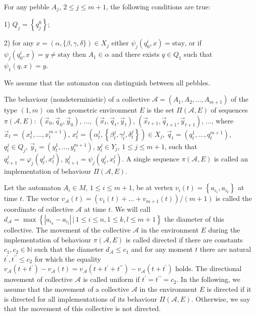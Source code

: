 \documentclass{article}
\begin{document}
For any pebble $A_{j}$, $2 \leq j \leq m+1$, the following conditions are true:

1) $Q_{j} = \left\{ q^{0}_{j} \right\}$;

2) for any $x = \left( \alpha, \{ \beta, \gamma, \delta \} \right) \in X_{j}$ either $\psi_{j} \left( q^{i}_{0}, x \right) = \mathrm{stay}$, or if $\psi_{j} \left( q^{i}_{0}, x \right) = y \neq \mathrm{stay}$ then $A_{1} \in \alpha$ and there exists $q \in Q_{1}$ such that $\psi_{1} \left( q, x \right) = y$.

We assume that the automaton can distinguish between all pebbles.

The behaviour (nondeterministic) of a collective $\mathcal{A} = \left( A_{1}, A_{2}, ..., A_{m+1} \right)$ of the type $(1, m)$ on the geometric environment $E$ is the set $\Pi (\mathcal{A}, E)$ of sequences $\pi (\mathcal{A}, E)$:
$\left( \vec x_{0}, \vec q_{0}, \vec y_{0} \right)$, ..., $\left( \vec x_{t}, \vec q_{t}, \vec y_{t} \right)$, 
$\left( \vec x_{t+1}, \vec q_{t+1}, \vec y_{t+1} \right)$, ...,
where 
$\vec x_{t} = \left( x_{t}^{1}, \dots, x_{t}^{m+1}\right)$, 
$x_{t}^{j} = \left( \alpha_{t}^{j}, \left\{ \beta_{t}^{j}, \gamma_{t}^{j}, \delta_{t}^{j} \right\} \right) \in X_{j}$,
$\vec q_{t} = \left( q_{t}^{1}, \dots, q_{t}^{m+1} \right)$, 
$q_{t}^{j} \in Q_{j}$,
$\vec y_{t} = \left( y_{t}^{1}, \dots, y_{t}^{m+1} \right)$, $y_{t}^{j} \in Y_{j}$,
$1 \leq j \leq m+1$,
such that
$q_{t+1}^{j} = \varphi_{j} \left( q_{t}^{j}, x_{t}^{j} \right)$, $y_{t+1}^{j} = \psi_{j} \left( q_{t}^{j}, x_{t}^{j} \right)$.
A single sequence $\pi (\mathcal{A}, E)$ is called an implementation of behaviour $\Pi (\mathcal{A}, E)$.

Let the automaton $A_{i} \in M$, $1 \leq i \leq m+1$, be at vertex $v_{i}(t) = \left\{ a_{i_{1}}, a_{i_{2}} \right\}$ at time $t$.
The vector  $v_{\mathcal{A}} (t) = \left( v_{1} (t) + \ldots + v_{m+1} (t) \right) / (m+1)$ is called the coordinate of collective $\mathcal{A}$ at time $t$.
We will call $d_{\mathcal{A}} = \max\left\{ \left| a_{i_{k}} - a_{i_{l}} \right| \,\big\vert\, 1 \leqslant i \leqslant n, 1 \leqslant k, l \leqslant m+1 \right\}$ the diameter of this collective.
The movement of the collective $\mathcal{A}$ in the environment $E$ during the implementation of behaviour $\pi (\mathcal{A}, E)$ is called directed if there are constants $c_{1}, c_{2} \in \mathbb{N}$ such that the diameter $d_{\mathcal{A}} \leq c_{1}$ and for any moment $t$ there are natural $t^{\prime}, t^{\prime\prime} \leq c_{2}$ for which the equality $v_{\mathcal{A}} \left( t+t^{\prime} \right) - v_{\mathcal{A}} (t) = v_{\mathcal{A}} \left( t + t^{\prime} + t^{\prime\prime} \right) - v_{\mathcal{A}} \left( t+t^{\prime} \right)$ holds.
The directional movement of collective $\mathcal{A}$ is called uniform if $t^{\prime} = t^{\prime\prime} = c_{2}$.
In the following, we assume that the movement of a collective $\mathcal{A}$ in the environment $E$ is directed if it is directed for all implementations of its behaviour $\Pi (\mathcal{A}, E)$. 
Otherwise, we say that the movement of this collective is not directed.
\end{document}
